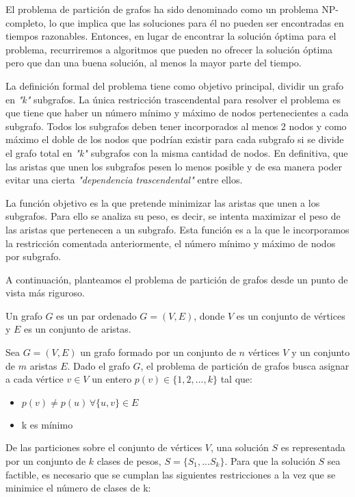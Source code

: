 El problema de partición de grafos ha sido denominado como un problema NP-completo\cite{NPCompleteness}, lo que implica que las soluciones para él no pueden ser encontradas en tiempos razonables. Entonces, en lugar de encontrar la solución óptima para el problema, recurriremos a algoritmos que pueden no ofrecer la solución óptima pero que dan una buena solución, al menos la mayor parte del tiempo.

La definición formal del problema tiene como objetivo principal, dividir un grafo en \textit{"k"} subgrafos. La única restricción trascendental para resolver el problema es que tiene que haber un número mínimo y máximo de nodos pertenecientes a cada subgrafo. Todos los subgrafos deben tener incorporados al menos 2 nodos y como máximo el doble de los nodos que podrían existir para cada subgrafo si se divide el grafo total en \textit{"k"} subgrafos con la misma cantidad de nodos. En definitiva, que las aristas que unen los subgrafos pesen lo menos posible y de esa manera poder evitar una cierta \textit{"dependencia trascendental"} entre ellos.

La función objetivo es la que pretende minimizar las aristas que unen a los subgrafos. Para ello se analiza su peso, es decir, se intenta maximizar el peso de las aristas que pertenecen a un subgrafo. Esta función es a la que le incorporamos la restricción comentada anteriormente, el número mínimo y máximo de nodos por subgrafo.

A continuación, planteamos el problema de partición de grafos desde un punto de vista más riguroso.

\begin{mydef}\label{def:grafo}
	Un grafo $G$ es un par ordenado $G = (V, E)$, donde $V$ es un conjunto de vértices y $E$ es un conjunto de aristas.
\end{mydef}

Sea $G = (V, E)$ un grafo formado por un conjunto de $n$ vértices $V$ y un conjunto de $m$ aristas $E$.
Dado el grafo $G$, el problema de partición de grafos busca asignar a cada vértice $v \in V$ un entero $p(v) \in \{1, 2, ..., k\}$ tal que:

\begin{itemize}
	\item $p(v) \neq p(u) \, \forall\{u, v\} \in E$
	\item k es mínimo
\end{itemize}

De las particiones sobre el conjunto de vértices $V$, una solución $S$ es representada por un conjunto de $k$ clases de pesos, $S = \{S_{1}, ... S_{k}\}$. Para que la solución $S$ sea factible, es necesario que se cumplan las siguientes restricciones a la vez que se minimice el número de clases de k:

